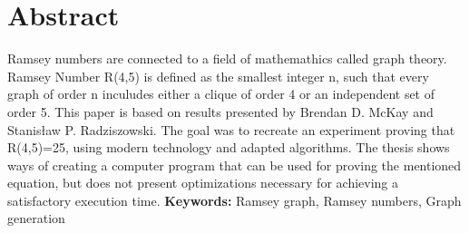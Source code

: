 \chapter*{Abstract}
\indent
Ramsey numbers are connected to a field of mathemathics called graph theory. Ramsey Number R(4,5) is defined as the smallest integer n, such that every graph of order n inculudes either a clique of order 4 or an independent set of order 5. This paper is based on results presented by Brendan D. McKay and Stanisław P. Radziszowski. The goal was to recreate an experiment proving that R(4,5)=25, using modern technology and adapted algorithms. The thesis shows ways of creating a computer program that can be used for proving the mentioned equation, but does not present optimizations necessary for achieving a satisfactory execution time.
\vspace{0.5cm}\newline
\textbf{Keywords:} Ramsey graph, Ramsey numbers, Graph generation \vspace{0.5cm}